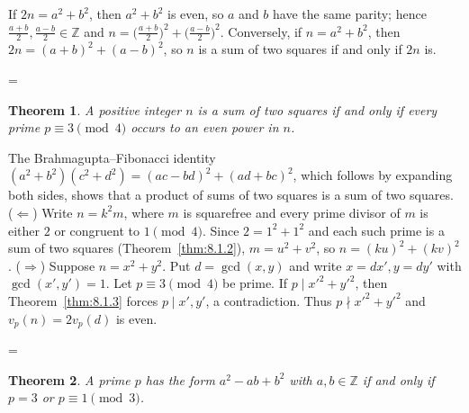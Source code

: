 \documentclass[11pt]{article}
\makeatletter
\theoremstyle{ntstyle}
\newtheorem{theorem}{Theorem}[subsection]
\let\nt@closedisplay\]
\def\nt@guardedclose{\@ifnextchar\par{\nt@closeafterpar}{\@ifnextchar\end{\postdisplaypenalty\@M\nt@closedisplay}{\nt@closedisplay}}}
\def\nt@closeafterpar\par{\@ifnextchar\par{\nt@closeafterpar}{\@ifnextchar\end{\postdisplaypenalty\@M\nt@closedisplay\par}{\nt@closedisplay\par}}}
\renewenvironment{proof}[1][\proofname]{\par
  \pushQED{\qed}\normalfont\topsep\medskipamount\edef\nt@afterproof{\@endparpenalty=\the\@endparpenalty\relax}\@beginparpenalty\@M\@endparpenalty\@M\let\]\nt@guardedclose\trivlist\item[]\textit{#1\@addpunct{.}} \ignorespaces}{\ifvmode\addpenalty\@M\fi\popQED\nt@afterproof\endtrivlist\@endpefalse}
\makeatother
\begin{document}
\begin{proof} If $2n = a^{2} + b^{2}$, then $a^{2} +
		b^{2}$ is even, so $a$ and $b$ have the same parity; hence
	$\tfrac{a+b}{2}, \tfrac{a-b}{2} \in \mathbb{Z}$ and $n =
		\big(\tfrac{a+b}{2}\big)^{2} + \big(\tfrac{a-b}{2}\big)^{2}$.
	Conversely, if $n = a^{2} + b^{2}$, then $2n = (a+b)^{2} + (a-b)^{2}$,
	so $n$ is a sum of two squares if and only if $2n$ is.

\end{proof}
\begin{theorem}\label{thm:8.1.5} A positive
	integer $n$ is a sum of two squares if and only if every prime $p
		\equiv 3 \pmod{4}$ occurs to an even power in $n$.

\end{theorem}

\begin{proof} The Brahmagupta--Fibonacci identity $(a^2 +
		b^2)(c^2 + d^2) = (ac - bd)^2 + (ad + bc)^2$, which follows by expanding both sides, shows that a product of sums
	of two squares is a sum of two squares. ($\Leftarrow$) Write $n=k^2m$, where $m$ is squarefree and every prime divisor
	of $m$ is either $2$ or congruent to $1\pmod{4}$. Since $2
		= 1^2 + 1^2$ and each such prime is a sum of two squares (Theorem~\ref{thm:8.1.2}), $m = u^2 + v^2$, so $n = (ku)^2 + (kv)^2$. ($\Rightarrow$) Suppose
	$n = x^2 + y^2$. Put $d = \gcd(x, y)$ and write $x = dx', y = dy'$ with $\gcd(x', y') = 1$. Let $p \equiv 3 \pmod{4}$ be prime. If $p \mid x'^2 + y'^2$, then Theorem~\ref{thm:8.1.3} forces $p \mid x', y'$, a contradiction. Thus $p \nmid x'^2 + y'^2$
	and $v_p(n) = 2v_p(d)$ is even.\qedhere

\end{proof}
\begin{theorem}\label{thm:8.1.6} A
	prime $p$ has the form $a^2 - ab + b^2$ with $a, b \in \mathbb{Z}$ if
	and only if $p = 3$ or $p \equiv 1 \pmod{3}$.

\end{theorem}
\end{document}
